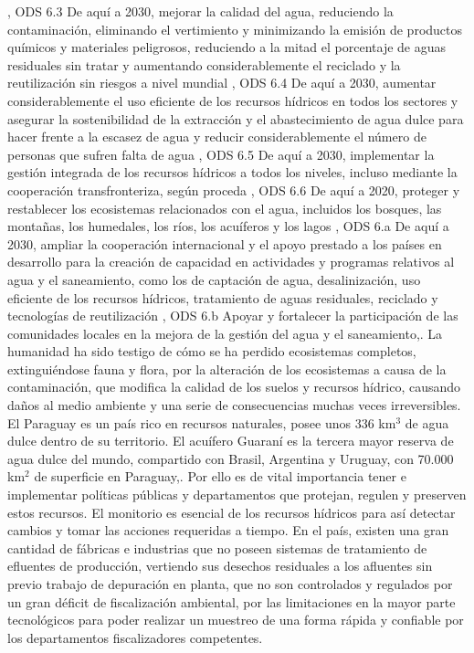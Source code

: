 , ODS 6.3  De aquí a 2030, mejorar la calidad del agua, reduciendo la contaminación, eliminando el vertimiento y minimizando la emisión de productos químicos y materiales peligrosos, reduciendo a la mitad el porcentaje de aguas residuales sin tratar y aumentando considerablemente el reciclado y la reutilización sin riesgos a nivel mundial
, ODS 6.4  De aquí a 2030, aumentar considerablemente el uso eficiente de los recursos hídricos en todos los sectores y asegurar la sostenibilidad de la extracción y el abastecimiento de agua dulce para hacer frente a la escasez de agua y reducir considerablemente el número de personas que sufren falta de agua
, ODS 6.5  De aquí a 2030, implementar la gestión integrada de los recursos hídricos a todos los niveles, incluso mediante la cooperación transfronteriza, según proceda
, ODS 6.6  De aquí a 2020, proteger y restablecer los ecosistemas relacionados con el agua, incluidos los bosques, las montañas, los humedales, los ríos, los acuíferos y los lagos
, ODS 6.a  De aquí a 2030, ampliar la cooperación internacional y el apoyo prestado a los países en desarrollo para la creación de capacidad en actividades y programas relativos al agua y el saneamiento, como los de captación de agua, desalinización, uso eficiente de los recursos hídricos, tratamiento de aguas residuales, reciclado y tecnologías de reutilización
, ODS 6.b  Apoyar y fortalecer la participación de las comunidades locales en la mejora de la gestión del agua y el saneamiento,\cite{moran_agua_nodate}.
La humanidad ha sido testigo de c\'omo se ha perdido ecosistemas completos, extinguiéndose fauna y flora, por la alteraci\'on de los ecosistemas a causa de la contaminaci\'on, que modifica la calidad de los suelos y recursos h\'idrico, causando da\~nos al medio ambiente y una serie de consecuencias muchas veces irreversibles.
El Paraguay es un pa\'is rico en recursos naturales, posee unos 336 km$^3$ de agua dulce dentro de su territorio. 
El acuífero Guaraní es la tercera mayor reserva de agua dulce del mundo, compartido con Brasil, Argentina y Uruguay, con 70.000 km$^{2}$ de superficie en Paraguay,\cite{stp_Agua}. 
Por ello es de vital importancia tener e implementar políticas p\'ublicas y departamentos que protejan, regulen y preserven estos recursos.
El monitorio es esencial de los recursos hídricos para así detectar cambios y tomar las acciones requeridas a tiempo.
En el país, existen una gran cantidad de fábricas e industrias que no poseen sistemas de tratamiento de efluentes de producci\'on, vertiendo sus desechos residuales a los afluentes sin previo trabajo de depuración en planta, que no son controlados y regulados por un gran déficit de fiscalización ambiental, por las limitaciones en la mayor parte tecnol\'ogicos para poder realizar un muestreo de una forma r\'apida y confiable por los departamentos fiscalizadores competentes. 
